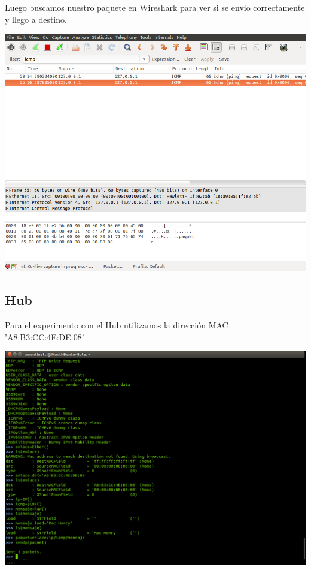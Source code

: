 \documentclass[spanish]{udpreport}
\begin{document}
Luego buscamos nuestro paquete en Wireshark para ver si se envio correctamente y llego a destino.

\begin{center}
	\includegraphics[scale=.37]{imagenes/Switch/Test_2_Wireshark.png}
\end{center}

\pagebreak

\subsection{Hub}

Para el experimento con el Hub utilizamos la dirección MAC 'A8:B3:CC:4E:DE:08'

\begin{center}
	\includegraphics[scale=.27]{imagenes/Hub/sendmanti.png}
	\\
\end{center}
\end{document}
